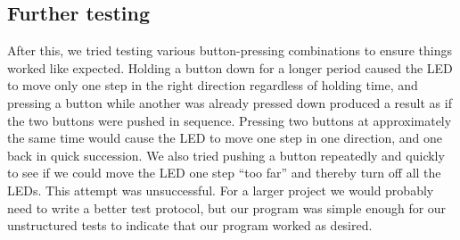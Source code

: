 \subsection{Further testing}
After this, we tried testing various button-pressing combinations to ensure things worked like expected. Holding a button down for a longer period caused the LED to move only one step in the right direction regardless of holding time, and pressing a button while another was already pressed down produced a result as if the two buttons were pushed in sequence. Pressing two buttons at approximately the same time would cause the LED to move one step in one direction, and one back in quick succession. We also tried pushing a button repeatedly and quickly to see if we could move the LED one step ``too far'' and thereby turn off all the LEDs. This attempt was unsuccessful. For a larger project we would probably need to write a better test protocol, but our program was simple enough for our unstructured tests to indicate that our program worked as desired.


